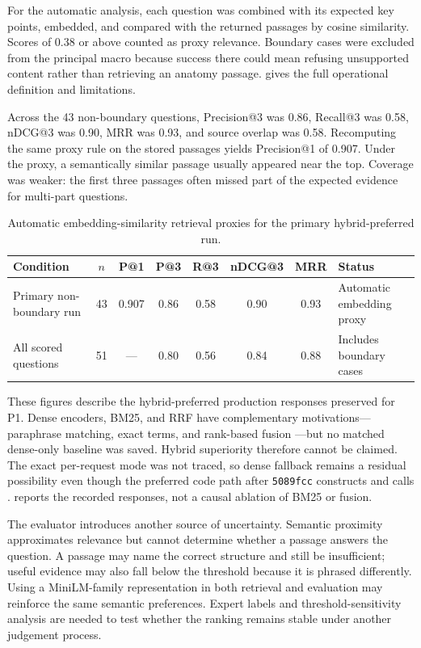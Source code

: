 For the automatic analysis, each question was combined with its expected key points, embedded, and compared with the returned passages by cosine similarity. Scores of 0.38 or above counted as proxy relevance. Boundary cases were excluded from the principal macro because success there could mean refusing unsupported content rather than retrieving an anatomy passage.  gives the full operational definition and limitations.

Across the 43 non-boundary questions, Precision@3 was 0.86, Recall@3 was 0.58, nDCG@3 was 0.90, MRR was 0.93, and source overlap was 0.58. Recomputing the same proxy rule on the stored passages yields Precision@1 of 0.907. Under the proxy, a semantically similar passage usually appeared near the top. Coverage was weaker: the first three passages often missed part of the expected evidence for multi-part questions.

\begin{table}[htbp]
  \centering
  \caption{Automatic embedding-similarity retrieval proxies for the primary hybrid-preferred run.}
  \label{tab:retrieval-results}
  \scriptsize
  \setlength{\tabcolsep}{3pt}
  \begin{tabularx}{\textwidth}{L{0.23\textwidth}CCCCCC Y}
    \toprule
    Condition & $n$ & P@1 & P@3 & R@3 & nDCG@3 & MRR & Status \\
    \midrule
    Primary non-boundary run & 43 & 0.907 & 0.86 & 0.58 & 0.90 & 0.93 & Automatic embedding proxy \\
    All scored questions & 51 & --- & 0.80 & 0.56 & 0.84 & 0.88 & Includes boundary cases \\
    \bottomrule
  \end{tabularx}
\end{table}

These figures describe the hybrid-preferred production responses preserved for P1. Dense encoders, BM25, and RRF have complementary motivations---paraphrase matching, exact terms, and rank-based fusion \parencite{karpukhin2020,reimers2019,robertson2009,cormack2009}---but no matched dense-only baseline was saved. Hybrid superiority therefore cannot be claimed. The exact per-request mode was not traced, so dense fallback remains a residual possibility even though the preferred code path after \texttt{5089fcc} constructs and calls .  reports the recorded responses, not a causal ablation of BM25 or fusion.

The evaluator introduces another source of uncertainty. Semantic proximity approximates relevance but cannot determine whether a passage answers the question. A passage may name the correct structure and still be insufficient; useful evidence may also fall below the threshold because it is phrased differently. Using a MiniLM-family representation in both retrieval and evaluation may reinforce the same semantic preferences. Expert labels and threshold-sensitivity analysis are needed to test whether the ranking remains stable under another judgement process.

